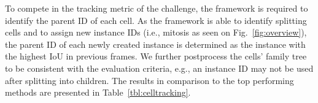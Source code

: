 \documentclass[runningheads,a4paper]{llncs}
\newcommand*\rot{\multicolumn{1}{R{45}{1em}}}%
\begin{document}
To compete in the tracking metric of the challenge, the framework is required to identify the parent ID of each cell.
As the framework is able to identify splitting cells and to assign new instance IDs (i.e., mitosis as seen on Fig.~\ref{fig:overview}), the parent ID of each newly created instance is determined as the instance with the highest IoU in previous frames.
We further postprocess the cells' family tree to be consistent with the evaluation criteria, e.g., an instance ID may not be used after splitting into children.
The results in comparison to the top performing methods are presented in Table~\ref{tbl:celltracking}.





\end{document}
